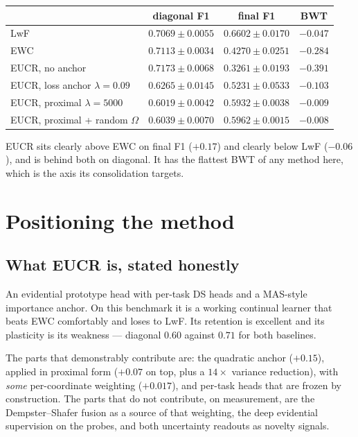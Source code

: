 \documentclass{article}
\begin{document}
\begin{center}
\begin{tabular}{lccc}
\toprule
 & diagonal F1 & final F1 & BWT \\
\midrule
LwF                              & $0.7069 \pm 0.0055$ & $\mathbf{0.6602 \pm 0.0170}$ & $-0.047$ \\
EWC                              & $0.7113 \pm 0.0034$ & $0.4270 \pm 0.0251$ & $-0.284$ \\
\midrule
EUCR, no anchor                  & $0.7173 \pm 0.0068$ & $0.3261 \pm 0.0193$ & $-0.391$ \\
EUCR, loss anchor $\lambda=0.09$ & $0.6265 \pm 0.0145$ & $0.5231 \pm 0.0533$ & $-0.103$ \\
EUCR, proximal $\lambda=5000$    & $0.6019 \pm 0.0042$ & $0.5932 \pm 0.0038$ & $-0.009$ \\
EUCR, proximal + random $\Omega$ & $0.6039 \pm 0.0070$ & $\mathbf{0.5962 \pm 0.0015}$ & $-0.008$ \\
\bottomrule
\end{tabular}
\end{center}

EUCR sits clearly above EWC on final F1 ($+0.17$) and clearly below LwF
($-0.06$), and is behind both on diagonal. It has the flattest BWT of any method
here, which is the axis its consolidation targets.

\section{Positioning the method}

\subsection{What EUCR is, stated honestly}

An evidential prototype head with per-task DS heads and a MAS-style importance
anchor. On this benchmark it is a working continual learner that beats EWC
comfortably and loses to LwF. Its retention is excellent and its plasticity is
its weakness --- diagonal $0.60$ against $0.71$ for both baselines.

The parts that demonstrably contribute are: the quadratic anchor ($+0.15$),
applied in proximal form ($+0.07$ on top, plus a $14\times$ variance reduction),
with \emph{some} per-coordinate weighting ($+0.017$), and per-task heads that are
frozen by construction. The parts that do not contribute, on measurement, are the
Dempster--Shafer fusion as a source of that weighting, the deep evidential
supervision on the probes, and both uncertainty readouts as novelty signals.
\end{document}
